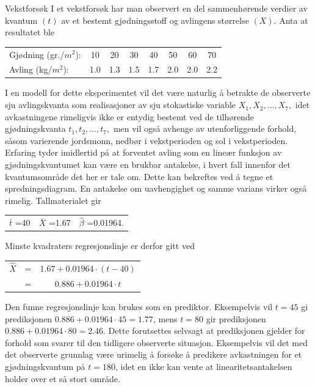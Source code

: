 \begin{eksempel}{Vekstforsøk}
I et vekstforsøk har man observert en del sammenhørende
verdier av kvantum $(t)$ av et bestemt gjødningsstoff og
avlingens størrelse $(X)$. Anta at resultatet ble
\begin{center}
\begin{tabular}{lccccccc}
Gjødning (gr./$m^2$):& 10 & 20 & 30 & 40 & 50 & 60 & 70 \\
Avling (kg/$m^2$):      & 1.0& 1.3& 1.5& 1.7& 2.0& 2.0& 2.2
\end{tabular}
\end{center}
I en modell for dette eksperimentet vil det være naturlig
å betrakte de observerte sju avlingskvanta som realisasjoner
av sju stokastiske variable $X_1,X_2,\ldots ,X_7,$ idet
avkastningene rimeligvis ikke er entydig bestemt ved de
tilhørende gjødningskvanta $t_1,t_2,\ldots ,t_7,$ men vil
også avhenge av utenforliggende forhold, såsom varierende
jordsmonn, nedbør i vekstperioden og sol i vekstperioden.
Erfaring tyder imidlertid på at forventet avling som en
lineær funksjon av gjødningskvantumet kan være en
brukbar antakelse, i hvert fall innenfor det kvantumsområde
det her er tale om. Dette kan bekreftes ved å tegne et
spredningsdiagram. En antakelse om uavhengighet og samme varians
virker også rimelig. Tallmaterialet gir
\begin{center}
\begin{tabular}{ccc}
 $\bar t$ =40 &  $\bar X$ =1.67 & $\hat{\beta}$ =0.01964.
\end{tabular}
\end{center}
Minste kvadraters regresjonslinje er derfor gitt ved
\begin{center}
\begin{tabular}{ccc}
  $\hat X$ &=&$1.67 + 0.01964\cdot (t-40)$ \\
           &=&$0.886 + 0.01964\cdot t$
\end{tabular}
\end{center}
Den funne regresjonslinje kan brukes som en prediktor.
Eksempelvis vil $t=45$ gi prediksjonen $0.886+0.01964\cdot
45=1.77$, mens $t=80$ gir prediksjonen $0.886+0.01964\cdot
80=2.46$. Dette forutsettes selvsagt at prediksjonen gjelder for
forhold som svarer til den tidligere observerte situasjon.
Eksempelvis vil det med det observerte grunnlag være urimelig
å forsøke å predikere avkastningen for et
gjødningskvantum på $t=180$, idet en ikke kan vente at
linearitetsantakelsen holder over et så stort område.
\end{eksempel}

